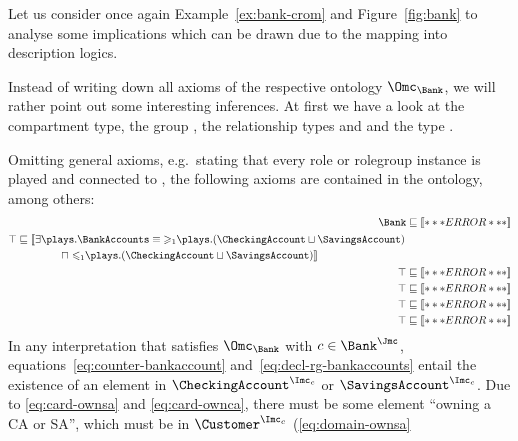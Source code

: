 Let us consider once again Example~\ref{ex:bank-crom} and Figure~\ref{fig:bank} to analyse some
implications which can be drawn due to the mapping into description logics.

\begin{example}
  Instead of writing down all axioms of the respective ontology $\Omc_{\Bank}$, we will rather point
  out some interesting inferences. At first we have a look at the \Bank compartment type, the
  \rosirole group \BankAccounts, the relationship types \ownca and \ownsa and the \rosirole type
  \Customer.

  Omitting general axioms, e.g.\ stating that every role or rolegroup instance is played and
  connected to \occurCounter, the following axioms are contained in the ontology, among others:
  {\setlength{\jot}{4pt}
  \begin{align}
    \Bank & \sqsubseteq \oax{(\atleast{1}{\counts}{\BankAccounts})(\occurCounter)}\label{eq:counter-bankaccount}\\
    \begin{split}
      \top & \sqsubseteq \oaxl{\exists\plays.\BankAccounts \equiv \atleast{1}{\plays}{(\CheckingAccount\sqcup\SavingsAccount)}}\\
      & \qquad\qquad \sqcap \oaxr{\atmost{1}{\plays}{(\CheckingAccount\sqcup\SavingsAccount)}}
    \end{split}\label{eq:decl-rg-bankaccounts}\\
    \top & \sqsubseteq \oax{\SavingsAccount\sqsubseteq\atleast{1}{\ownsa^{-}}{\top}}\label{eq:card-ownsa}\\
    \top & \sqsubseteq \oax{\CheckingAccount\sqsubseteq\atleast{1}{\ownca^{-}}{\top}}\label{eq:card-ownca}\\
    \top & \sqsubseteq \oax{\exists\ownsa.\top\sqsubseteq\Customer}\label{eq:domain-ownsa}\\
    \top & \sqsubseteq \oax{\exists\ownca.\top\sqsubseteq\Customer}\label{eq:domain-ownca}
  \end{align}
  }
  In any interpretation \J that satisfies $\Omc_{\Bank}$ with $c\in\Bank^{\J}$,
  equations~\eqref{eq:counter-bankaccount} and~\eqref{eq:decl-rg-bankaccounts} entail the existence
  of an element in $\CheckingAccount^{\I_{c}}$ or $\SavingsAccount^{\I_{c}}$. Due to
  \eqref{eq:card-ownsa} and \eqref{eq:card-ownca}, there must be some element ``owning a CA or SA'',
  which must be in $\Customer^{\I_{c}}$ (\eqref{eq:domain-ownsa}

\end{example}
